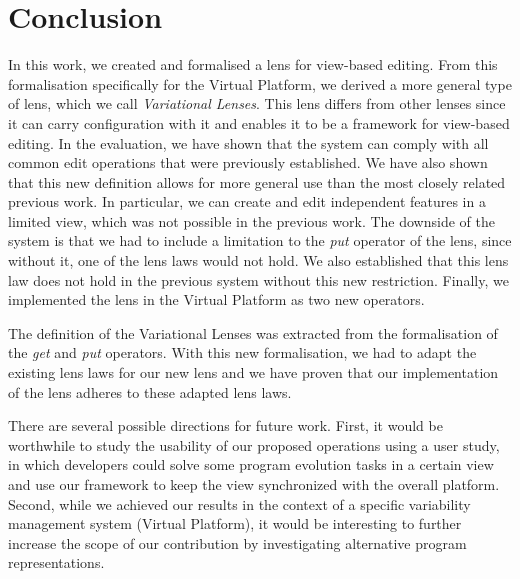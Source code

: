 \chapter{Conclusion}\label{sec:conclusion}
In this work, we created and formalised a lens for view-based editing. From 
this formalisation
specifically for the Virtual Platform, we derived a more general type of lens,
which we call \emph{Variational Lenses}. This lens differs from other lenses
since it can carry configuration with it and enables it to be a framework for
view-based editing. In the evaluation, we have shown that the system
can comply with all common edit operations that were previously established. 
We have also shown that this new definition allows for more general use than 
the most closely related previous work.
In particular, we can create and edit
independent features in a limited view, which was not possible in the previous work. 
The downside of the system is that we had to include a limitation to the 
\emph{put} operator of the lens, since without it, one of the lens laws would
not hold. We also established that this lens law does not hold in the previous
system without this new restriction. Finally, we implemented the lens in the
Virtual Platform as two new operators.

The definition of the Variational Lenses was extracted from the formalisation
of the \emph{get} and \emph{put} operators. With this new formalisation, we had
to adapt the existing lens laws for our new lens and we have proven that our
implementation of the lens adheres to these adapted lens laws.

There are several possible directions for future work. First, it would be worthwhile
to study the usability of our proposed operations using a user study, 
in which developers could solve some program evolution tasks in a certain view and use 
our framework to keep the view synchronized with the overall platform. Second, while 
we achieved our results in the context of a specific variability management system 
(Virtual Platform), it would be interesting to further increase the scope of our 
contribution by investigating alternative program representations.
